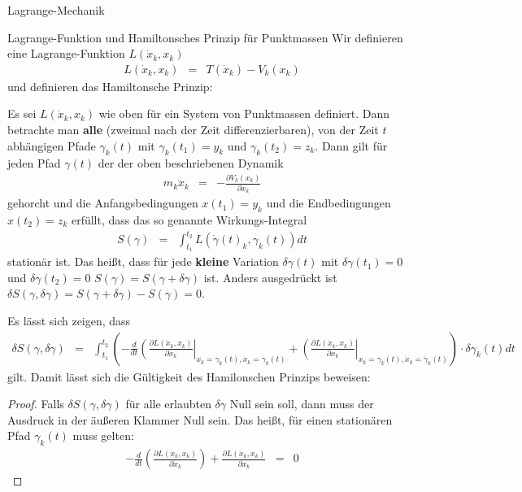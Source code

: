 \begin{chapter}{\titlestr}
\begin{section}{Lagrange-Mechanik}
\begin{subsection}{Lagrange-Funktion und Hamiltonsches Prinzip für Punktmassen}
Wir definieren eine Lagrange-Funktion $L(\dot{x}_k, x_k)$
\begin{eqnarray*}
L(\dot{x}_k, x_k) &=& T(\dot{x}_k)-V_k(x_k)
\end{eqnarray*}
und definieren das Hamiltonsche Prinzip:
\begin{theorem}
Es sei $L(\dot{x}_k, x_k)$ wie oben für ein System von Punktmassen definiert. Dann betrachte man \textbf{alle} (zweimal nach der Zeit differenzierbaren), von der Zeit $t$ abhängigen
Pfade $\gamma_k(t)$ mit $\gamma_k(t_1)= y_k$ und $\gamma_k(t_2)= z_k$. Dann gilt für jeden Pfad $\gamma(t)$ der der oben beschriebenen Dynamik
\begin{eqnarray}
\label{points_dynamic}
m_k\ddot{x}_k &=& -\frac{\partial V_k(x_k)}{\partial x_k}
\end{eqnarray}
gehorcht und die Anfangsbedingungen $x(t_1)=y_k$ und die Endbedingungen $x(t_2)=z_k$ erfüllt, dass das so genannte Wirkungs-Integral
\begin{eqnarray*}
S(\gamma) &=& \int_{t_1}^{t_2}L(\dot{\gamma}(t)_k, \gamma_k(t)) dt
\end{eqnarray*}
stationär ist. Das heißt, dass für jede \textbf{kleine} Variation $\delta\gamma(t)$ mit $\delta\gamma(t_1)=0$ und $\delta\gamma(t_2)=0$
$S(\gamma)=S(\gamma+\delta \gamma)$ ist. Anders ausgedrückt ist $\delta S(\gamma,\delta\gamma)= S(\gamma+\delta \gamma)-S(\gamma)=0$.
\end{theorem}
Es lässt sich zeigen, dass
\begin{eqnarray*}
\delta S(\gamma,\delta \gamma) &=& \int_{t_1}^{t_2}\left(-\frac{d}{dt}\left(\frac{\partial L(\dot{x}_k,x_k)}{\partial \dot{x}_k}\right|_{x_k=\gamma_k(t),\dot{x}_k=\dot{\gamma}_k(t)}+\left(\frac{\partial L(\dot{x}_k, x_k)}{\partial x_k}\right|_{x_k=\gamma_k(t),\dot{x}_k=\dot{\gamma}_k(t)}\right)\cdot \delta\gamma_k(t) dt
\end{eqnarray*}
gilt. Damit lässt sich die Gültigkeit des Hamilonschen Prinzips beweisen:
\begin{proof}
Falls $\delta S(\gamma,\delta\gamma)$ für alle erlaubten $\delta\gamma$ Null sein soll, dann muss der Ausdruck in der äußeren Klammer Null sein. Das heißt, für einen stationären Pfad $\gamma_k(t)$ muss gelten:
\begin{eqnarray*}
-\frac{d}{dt}\left(\frac{\partial L(\dot{x}_k,x_k)}{\partial \dot{x}_k}\right)+\frac{\partial L(\dot{x}_k, x_k)}{\partial x_k}&=&0

\end{eqnarray*}
\end{proof}
\end{subsection}
\end{section}
\end{chapter}
